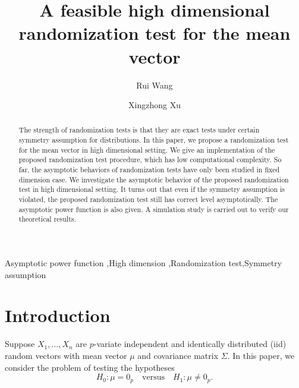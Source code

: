 \documentclass[review]{elsarticle}
\theoremstyle{plain}
\theoremstyle{definition}
\theoremstyle{remark}
\begin{document}
\begin{frontmatter}
\title{A feasible high dimensional randomization test for the mean vector}

\author[mymainaddress]{Rui Wang}
\author[mymainaddress,mysecondaryaddress]{Xingzhong Xu}
\address[mymainaddress]{School of Mathematics and Statistics, Beijing Institute of Technology, Beijing 100081,China}
\address[mysecondaryaddress]{Beijing Key Laboratory on MCAACI, Beijing Institute of Technology, Beijing 100081,China}

\begin{abstract}
    The strength of randomization tests is that they are exact tests under certain symmetry assumption for distributions.
    In this paper, we propose a randomization test for the mean vector in high dimensional setting. 
    We give an implementation of the proposed randomization test procedure, which has low computational complexity.
    So far, the asymptotic behaviors of randomization tests have only been studied in fixed dimension case.
    We investigate the asymptotic behavior of the proposed randomization test in high dimensional setting.
    It turns out that even if the symmetry assumption is violated, the proposed randomization test still has correct level asymptotically.
    The asymptotic power function is also given.
    A simulation study is carried out to verify our theoretical results.
    

\end{abstract}

\begin{keyword}
   Asymptotic power function \sep High dimension \sep Randomization test\sep Symmetry assumption
\end{keyword}
\end{frontmatter}

\section{Introduction}

Suppose $X_{1},\ldots,X_{n}$ are $p$-variate independent and identically distributed (iid) random vectors with mean vector $\mu$ and covariance matrix $\Sigma$. In this paper, we consider the problem of testing the hypotheses
\begin{equation}\label{ourHy}
    H_0:\mu=0_p\quad \textrm{versus} \quad H_1:\mu\neq 0_p.
\end{equation}
\end{document}
